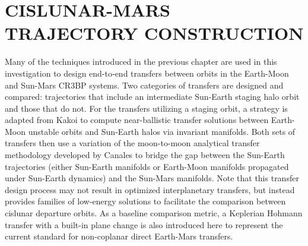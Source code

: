 \chapter{CISLUNAR-MARS TRAJECTORY CONSTRUCTION}

Many of the techniques introduced in the previous chapter are used in this investigation to design
end-to-end transfers between orbits in the Earth-Moon and Sun-Mars CR3BP systems. Two categories of
transfers are designed and compared: trajectories that include an intermediate Sun-Earth staging
halo orbit and those that do not. For the transfers utilizing a staging orbit, a strategy is
adapted from Kakoi to compute near-ballistic transfer solutions between Earth-Moon unstable orbits
and Sun-Earth halos via invariant manifolds\cite{Kakoi:2015}. Both sets of transfers then use a
variation of the moon-to-moon analytical transfer methodology developed by Canales to bridge the
gap between the Sun-Earth trajectories (either Sun-Earth manifolds or Earth-Moon manifolds
propagated under Sun-Earth dynamics) and the Sun-Mars manifolds\cite{Canales:2021b}. Note that this
transfer design process may not result in optimized interplanetary transfers, but instead provides
families of low-energy solutions to facilitate the comparison between cislunar departure orbits. As
a baseline comparison metric, a Keplerian Hohmann transfer with a built-in plane change is also
introduced here to represent the current standard for non-coplanar direct Earth-Mars transfers.





